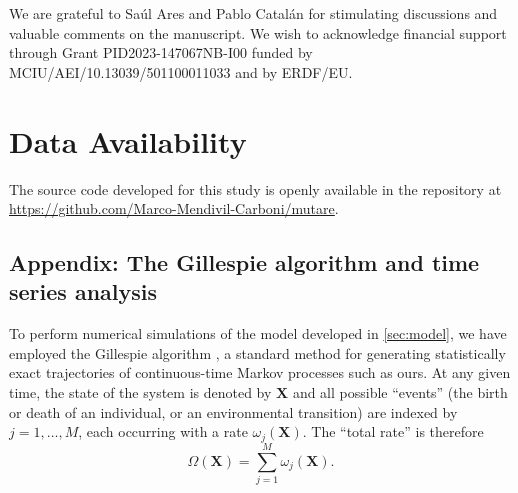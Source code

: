\documentclass[aps,pre,reprint,10pt,superscriptaddress]{revtex4-2}
\begin{document}
\begin{acknowledgments}
    We are grateful to Sa\'ul Ares and Pablo Catal\'an for stimulating discussions and valuable comments on the manuscript. We wish to acknowledge financial support through Grant PID2023-147067NB-I00 funded by MCIU\slash AEI\slash 10.13039\slash 501100011033 and by ERDF/EU.
\end{acknowledgments}

\section*{Data Availability}
The source code developed for this study is openly available in the repository at \url{https://github.com/Marco-Mendivil-Carboni/mutare}.

\begin{appendices}

    \setcounter{equation}{0}
    \setcounter{figure}{0}
    \setcounter{table}{0}
    \renewcommand{\theequation}{A\arabic{equation}}
    \renewcommand{\thefigure}{A\arabic{figure}}
    \renewcommand{\thetable}{A\arabic{table}}

    \section*{Appendix: The Gillespie algorithm and time series analysis} \label{sec:gillespie_algorithm}

    To perform numerical simulations of the model developed in \cref{sec:model}, we have employed the Gillespie algorithm \cite{toralStochasticNumericalMethods}, a standard method for generating statistically exact trajectories of continuous-time Markov processes such as ours. At any given time, the state of the system is denoted by $\mathbf{X}$ and all possible ``events'' (the birth or death of an individual, or an environmental transition) are indexed by $j=1,\dots,M$, each occurring with a rate $\omega_j(\mathbf{X})$. The ``total rate'' is therefore
    \begin{equation}
        \Omega(\mathbf{X})=\sum_{j=1}^M\omega_j(\mathbf{X}).
    \end{equation}


\end{appendices}
\end{document}
